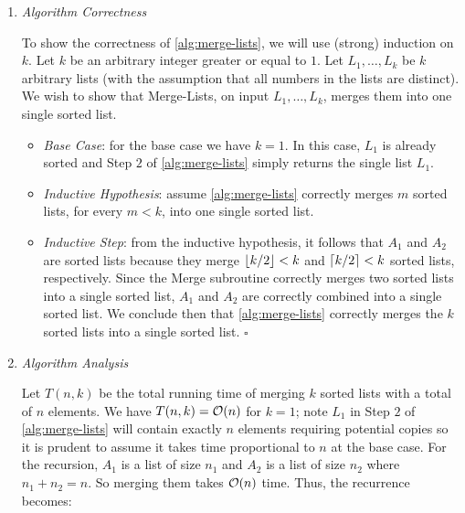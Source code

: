 \documentclass{article}
\begin{document}
\begin{enumerate}[leftmargin={*}, font={\bf}, label={\arabic*.}, ref={\arabic*}]
\begin{enumerate}
      \item \label{qst:1c}
        {\it Algorithm Correctness}

        To show the correctness of \autoref{alg:merge-lists}, we will use (strong) induction on
        $k$. Let $k$ be an arbitrary integer greater or equal to $1$. Let $L_1, \ldots, L_k$ be
        $k$ arbitrary lists (with the assumption that all numbers in the lists are distinct). We
        wish to show that {\sc Merge-Lists}, on input $L_1, \ldots, L_k$, merges them into one
        single sorted list.

        \begin{itemize}[itemsep=0pt]
          \item
            {\it Base Case}: for the base case we have $k = 1$. In this case, $L_1$ is already
            sorted and Step $2$ of \autoref{alg:merge-lists} simply returns the single list $L_1$.

          \item
            {\it Inductive Hypothesis}: assume \autoref{alg:merge-lists} correctly merges $m$
            sorted lists, for every $m < k$, into one single sorted list.

          \item
            {\it Inductive Step}: from the inductive hypothesis, it follows that $A_1$ and $A_2$
            are sorted lists because they merge $\lfloor k/2\rfloor < k$ and $\lceil k/2\rceil < k$ sorted 
            lists, respectively. Since the {\sc Merge} subroutine correctly merges two sorted lists
            into a single sorted list, $A_1$ and $A_2$ are correctly combined into a single sorted
            list. We conclude then that \autoref{alg:merge-lists} correctly merges the $k$ sorted
            lists into a single sorted list. \hfill $\square$
        \end{itemize}

      \item \label{qst:1d}
        {\it Algorithm Analysis}

        Let $T(n, k)$ be the total running time of merging $k$ sorted lists with a total of $n$
        elements. We have $T(n, k) = \operatorname*{\mathcal{O}}(n)$ for $k = 1$; note $L_1$ in Step $2$ of
        \autoref{alg:merge-lists} will contain exactly $n$ elements requiring potential copies
        so it is prudent to assume it takes time proportional to $n$ at the base case. For the
        recursion, $A_1$ is a list of size $n_1$ and $A_2$ is a list of size $n_2$ where $n_1 +
        n_2 = n$. So merging them takes $\operatorname*{\mathcal{O}}(n)$ time. Thus, the recurrence becomes:


\end{enumerate}
\end{enumerate}
\end{document}
